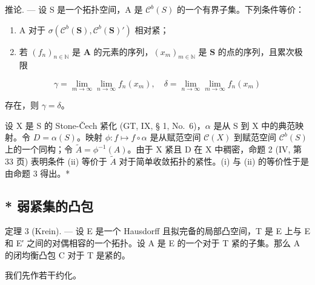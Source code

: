 推论. --- 设 S 是一个拓扑空间，A 是 \(\mathcal{C}^{b}(S)\) 的一个有界子集。下列条件等价：

\begin{enumerate}
\def\labelenumi{(\roman{enumi})}
\item
  A 对于 \(\sigma(\mathcal{C}^b(\mathbf{S}),\mathcal{C}^b(\mathbf{S})')\) 相对紧；
\item
  若 \((f_n)_{n\in \mathbb{N}}\) 是 \(\mathbf{A}\) 的元素的序列，\((x_m)_{m\in \mathbb{N}}\) 是 \(\mathbf{S}\) 的点的序列，且累次极限
\end{enumerate}

\[
\gamma = \lim _ {m \rightarrow \infty} \lim _ {n \rightarrow \infty} f _ {n} (x _ {m}), \quad \delta = \lim _ {n \rightarrow \infty} \lim _ {m \rightarrow \infty} f _ {n} (x _ {m})
\]

存在，则 \(\gamma = \delta\)。

设 X 是 S 的 Stone-Čech 紧化 (GT, IX, § 1, No.~6)，\(\alpha\) 是从 S 到 X 中的典范映射。令 \(D = \alpha(S)\)。映射 \(\phi: f \mapsto f \circ \alpha\) 是从赋范空间 \(\mathcal{C}(X)\) 到赋范空间 \(\mathcal{C}^b(S)\) 上的一个同构；令 \(\tilde{A} = \phi^{-1}(A)\)。由于 X 紧且 D 在 X 中稠密，命题 2 (IV, 第 33 页) 表明条件 (ii) 等价于 \(\tilde{A}\) 对于简单收敛拓扑的紧性。(i) 与 (ii) 的等价性于是由命题 3 得出。*

\subsection{* 弱紧集的凸包}

定理 3 (Krein). --- 设 E 是一个 Hausdorff 且拟完备的局部凸空间，T 是 E 上与 E 和 E′ 之间的对偶相容的一个拓扑。设 A 是 E 的一个对于 T 紧的子集。那么 A 的闭均衡凸包 C 对于 T 是紧的。

我们先作若干约化。

